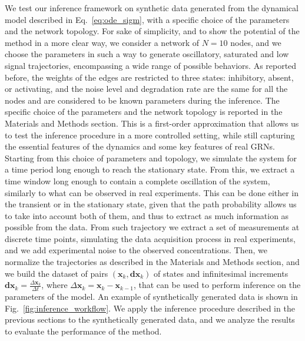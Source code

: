 \documentclass[10pt, aps, rmp,  twocolumn, superscriptaddress, floatfix, showkeys]{revtex4-2}
\begin{document}
We test our inference framework on synthetic data generated from the dynamical model described in Eq.~\ref{eq:ode_sigm}, with a specific choice of the parameters and the network topology. For sake of simplicity, and to show the potential of the method in a more clear way, we consider a network of $N=10$ nodes, and we choose the parameters in such a way to generate oscillatory, saturated and low signal trajectories, encompassing a wide range of possible behaviors. As reported before, the weights of the edges are restricted to three states: inhibitory, absent, or activating, and the noise level and degradation rate are the same for all the nodes and are considered to be known parameters during the inference. The specific choice of the parameters and the network topology is reported in the Materials and Methods section. This is a first-order approximation that allows us to test the inference procedure in a more controlled setting, while still capturing the essential features of the dynamics and some key features of real GRNs.
Starting from this choice of parameters and topology, we simulate the system for a time period long enough to reach the stationary state. From this, we extract a time window long enough to contain a complete oscillation of the system, similarly to what can be observed in real experiments. This can be done either in the transient or in the stationary state, given that the path probability allows us to take into account both of them, and thus to extract as much information as possible from the data.
From such trajectory we extract a set of measurements at discrete time points, simulating the data acquisition process in real experiments, and we add experimental noise to the observed concentrations.
Then, we normalize the trajectories as described in the Materials and Methods section, and we build the dataset of pairs $(\mathbf{x}_k, \mathbf{dx}_k)$ of states and infinitesimal increments $\mathbf{dx}_k = \frac{\Delta \mathbf{x}_k}{\Delta t}$, where $\Delta \mathbf{x}_k = \mathbf{x}_k - \mathbf{x}_{k-1}$, that can be used to perform inference on the parameters of the model. 
An example of synthetically generated data is shown in Fig.~\ref{fig:inference_workflow}.
We apply the inference procedure described in the previous sections to the synthetically generated data, and we analyze the results to evaluate the performance of the method.
\end{document}
